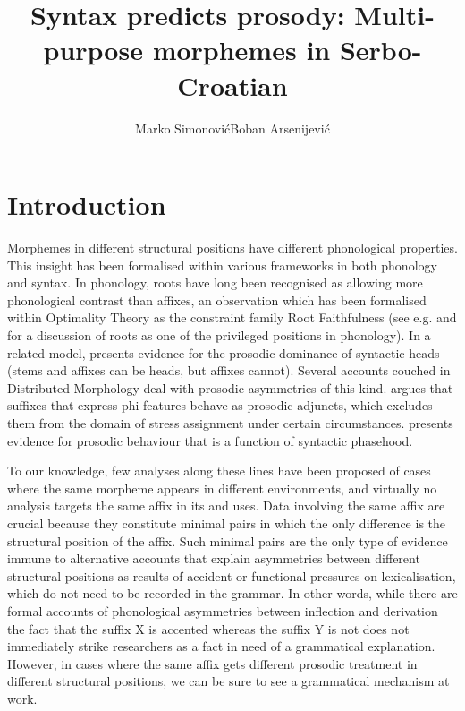 \documentclass[output=paper, colorlinks, citecolor=brown, newtxmath]{langsci/langscibook}
\author{Marko Simonović\affiliation{University of Nova Gorica}\orcid{0000-0002-9651-6399}\lastand  Boban Arsenijević\affiliation{University of Graz}\orcid{0000-0002-1124-6319}}
\title{Syntax predicts prosody: Multi-purpose morphemes in Serbo-Croatian}
\begin{document}
%
\maketitle%

\section{Introduction}\label{sec:simonovic:1}

Morphemes in different structural positions have different phonological properties. This insight has been formalised within various frameworks in both phonology and syntax. In phonology, roots have long been recognised as allowing more phonological contrast than affixes, an observation which has been formalised within Optimality Theory as the constraint family Root Faithfulness (see e.g. \citealt{Mcc1993} and  \citealt{Bec1997} for a discussion of roots as one of the privileged positions in phonology). In a related model, \citet{Revithiadou1999} presents evidence for the prosodic dominance of syntactic heads (stems and  affixes can be heads, but  affixes cannot). Several accounts couched in Distributed Morphology \citep{Hal1993,Hal1994} deal with pro\-so\-dic asymmetries of this kind. \citet{Don2017} argues that  suffixes that express phi-features behave as prosodic adjuncts, which excludes them from the domain of stress assignment under certain circumstances. \citet{Mar2002} presents evidence for prosodic behaviour that is a function of syntactic phasehood.

To our knowledge, few analyses along these lines have been proposed of cases where the same morpheme appears in different environments, and virtually no analysis targets the same affix in its  and  uses. Data involving the same affix are crucial because they constitute minimal pairs in which the only difference is the structural position of the affix. Such minimal pairs are the only type of evidence immune to alternative accounts that explain asymmetries between different structural positions as results of accident or functional pressures on lexicalisation, which do not need to be recorded in the grammar. In other words, while there are formal accounts of phonological asymmetries between inflection and derivation \citep[e.g.][]{Mcc1993, Bec1997, Revithiadou1999} the fact that the  suffix X is accented whereas the  suffix Y is not does not immediately strike researchers as a fact in need of a grammatical explanation. However, in cases where the same affix gets different prosodic treatment in different structural positions, we can be sure to see a grammatical mechanism at work.
\end{document}
